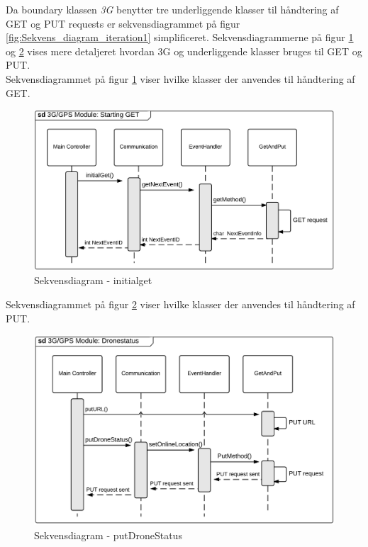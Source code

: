 Da boundary klassen \textit{3G} benytter tre underliggende klasser til håndtering af GET og PUT requests er sekvensdiagrammet på figur \ref{fig:Sekvens_diagram_iteration1} simplificeret. Sekvensdiagrammerne på figur \ref{fig:Sekvens_diagram_initialget} og \ref{fig:Sekvens_diagram_putDroneStatus} vises mere detaljeret hvordan 3G og underliggende klasser bruges til GET og PUT. \\

Sekvensdiagrammet på figur \ref{fig:Sekvens_diagram_initialget} viser hvilke klasser der anvendes til håndtering af GET. 

\begin{figure}[H]
	\centering
	\includegraphics[width=1\textwidth]{Billeder/sekvens/sekvens_iteration1_initialget}
	\caption{Sekvensdiagram - initialget}
	\label{fig:Sekvens_diagram_initialget}
\end{figure}

\vspace{.5cm}

Sekvensdiagrammet på figur \ref{fig:Sekvens_diagram_putDroneStatus} viser hvilke klasser der anvendes til håndtering af PUT. 

\begin{figure}[H]
	\centering
	\includegraphics[width=1\textwidth]{Billeder/sekvens/sekvens_iteration1_putdronestatus}
	\caption{Sekvensdiagram - putDroneStatus}
	\label{fig:Sekvens_diagram_putDroneStatus}
\end{figure}


